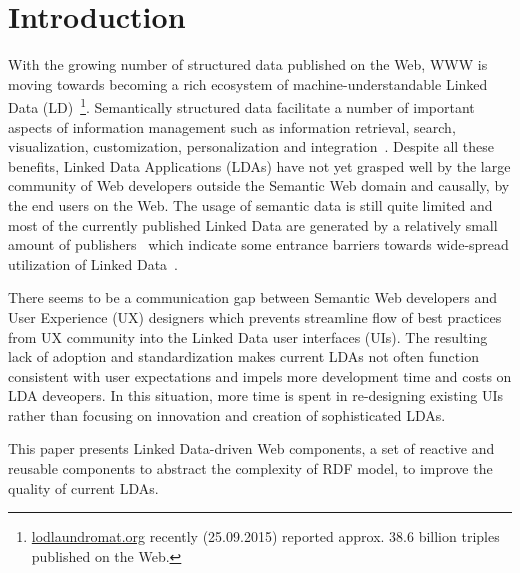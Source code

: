 \documentclass{acm_proc_article-sp}
\begin{document}




\section{Introduction}


With the growing number of structured data published on the Web, WWW is moving towards becoming a rich ecosystem of machine-understandable Linked Data (LD)~\footnote{\url{lodlaundromat.org} recently (25.09.2015) reported approx. 38.6 billion triples published on the Web.}.
Semantically structured data facilitate a number of important aspects of
information management such as information retrieval, search, visualization,  customization, personalization and integration~\cite{SCAJ-Khalili-2013}.
Despite all these benefits, Linked Data Applications (LDAs) have not yet grasped well by the large community of Web developers outside the Semantic Web domain and causally, by the end users on the Web.
The usage of semantic data is still quite limited and most of the currently published Linked Data are generated by a relatively small amount of publishers~\cite{ontowiki-swj} which indicate some entrance barriers towards wide-spread utilization of Linked Data~\cite{StegemannZ14}.

There seems to be a communication gap between Semantic Web developers and User Experience (UX) designers which prevents streamline flow of best practices from UX community into the Linked Data user interfaces (UIs).
The resulting lack of adoption and standardization makes current LDAs not often function consistent with user expectations and impels more development time and costs on LDA deveopers.
In this situation, more time is spent in re-designing existing UIs rather than focusing on innovation and creation of sophisticated LDAs.
 
This paper presents Linked Data-driven Web components, a set of reactive and reusable components to abstract the complexity of RDF model, to improve the quality of current LDAs.
\end{document}
